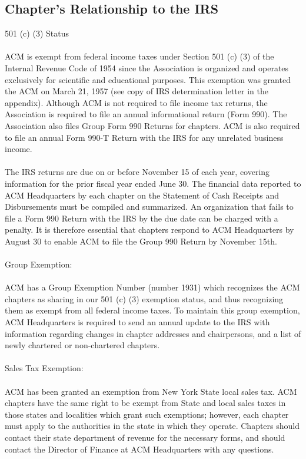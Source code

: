 \subsection{Chapter's Relationship to the IRS}
501 (c) (3) Status
\\
\\
ACM is exempt from federal income taxes under Section 501 (c) (3) of the Internal Revenue Code of 1954 since the Association is organized and operates exclusively for scientific and educational purposes. This exemption was granted the ACM on March 21, 1957 (see copy of IRS determination letter in the appendix). Although ACM is not required to file income tax returns, the Association is required to file an annual informational return (Form 990). The Association also files Group Form 990 Returns for chapters. ACM is also required to file an annual Form 990-T Return with the IRS for any unrelated business income.
\\
\\
The IRS returns are due on or before November 15 of each year, covering information for the prior fiscal year ended June 30. The financial data reported to ACM Headquarters by each chapter on the Statement of Cash Receipts and Disbursements must be compiled and summarized. An organization that fails to file a Form 990 Return with the IRS by the due date can be charged with a penalty. It is therefore essential that chapters respond to ACM Headquarters by August 30 to enable ACM to file the Group 990 Return by November 15th.
\\
\\
Group Exemption:
\\
\\
ACM has a Group Exemption Number (number 1931) which recognizes the ACM chapters as sharing in our 501 (c) (3) exemption status, and thus recognizing them as exempt from all federal income taxes. To maintain this group exemption, ACM Headquarters is required to send an annual update to the IRS with information regarding changes in chapter addresses and chairpersons, and a list of newly chartered or non-chartered chapters.
\\
\\
Sales Tax Exemption:
\\
\\
ACM has been granted an exemption from New York State local sales tax. ACM chapters have the same right to be exempt from State and local sales taxes in those states and localities which grant such exemptions; however, each chapter must apply to the authorities in the state in which they operate. Chapters should contact their state department of revenue for the necessary forms, and should contact the Director of Finance at ACM Headquarters with any questions.
